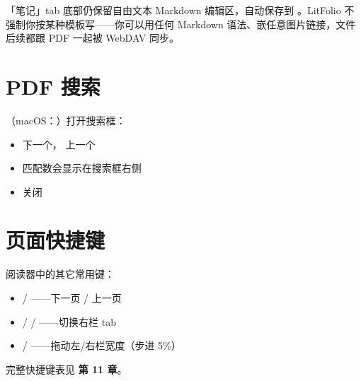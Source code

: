 「笔记」tab 底部仍保留自由文本 Markdown 编辑区，自动保存到
。LitFolio 不强制你按某种模板写——你可以用任何
Markdown 语法、嵌任意图片链接，文件后续都跟 PDF 一起被 WebDAV 同步。

\section{PDF 搜索}

（macOS：）打开搜索框：

\begin{itemize}
  \item {} 下一个， 上一个
  \item 匹配数会显示在搜索框右侧
  \item {} 关闭
\end{itemize}

\section{页面快捷键}

阅读器中的其它常用键：

\begin{itemize}
  \item {} / ——下一页 / 上一页
  \item {} /  / ——切换右栏 tab
  \item \kbd{[} / \kbd{]}——拖动左/右栏宽度（步进 5\%）
\end{itemize}

完整快捷键表见 \textbf{第 11 章}。
